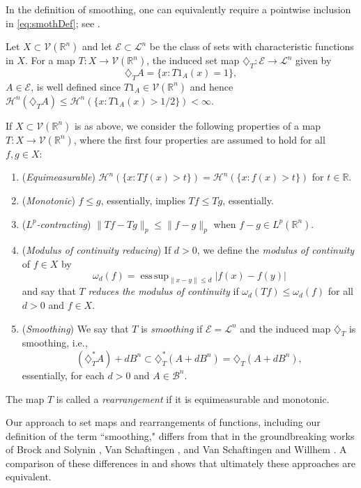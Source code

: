 \documentclass[12pt,reqno]{amsart}
\DeclareMathOperator*{\esssup}{ess\,sup}
\newcommand{\R}{{\mathbb R}}
\newcommand{\cH}{{\mathcal H}}
\newcommand{\cL}{\mathcal L}
\newcommand{\cE}{{\mathcal E}}
\newcommand{\cV}{{\mathcal V}}
\newcommand{\di}{\diamondsuit}
\numberwithin{equation}{section}
\begin{document}
In the definition of smoothing, one can equivalently require a pointwise inclusion in \eqref{eq:smothDef}; see \cite[p.~12]{BGGK2}.

Let $X\subset {\cV}(\R^n)$ and let $\cE\subset \cL^n$ be the class of sets with characteristic functions in $X$. For a map $T:X\to  {\cV}(\R^n)$, the induced set map $\di_T:\cE\to \cL^n$ given by
\begin{equation}\label{eqIndic}
\di_T A=\{x: T1_A(x)=1\},
\end{equation}
$A\in \cE$, is well defined since $T1_A\in {\cV}(\R^n)$ and hence  $\cH^n(\di_T A)\le \cH^n(\{x: T1_A(x)>1/2\})<\infty$.

If $X\subset {\cV}(\R^n)$ is as above, we consider the following properties of a map $T:X\to {\cV}(\R^n)$, where the first four properties are assumed to hold for all $f,g\in X$:

\begin{enumerate}
		\item[1.] ({\em Equimeasurable})\quad
		$
		{\mathcal{H}}^{n}(\{x: Tf(x)>t\})={\mathcal{H}}^{n}(\{x: f(x)>t\})
		$
		for $t\in \R$.
		\item[2.] ({\em Monotonic}) \quad $f\le g$, essentially, implies $Tf\le Tg$, essentially.
		\item[3.]  ({\em $L^p$-contracting}) \quad $\|Tf-Tg\|_p\le \|f-g\|_p$ when $f-g\in L^p(\R^n)$.
		\item[4.]   ({\em Modulus of continuity reducing})  If $d>0$, we define the {\em modulus of continuity} of $f\in X$ by
$$
\omega_{d}(f)=\esssup_{\|x-y\|\le d}|f(x)-f(y)|
$$
and say that $T$ {\em reduces the modulus of continuity} if $\omega_{d}(Tf)\le \omega_{d}(f)$ for all $d>0$ and $f\in X$.
		\item[5.] ({\em Smoothing}) \quad We say that $T$ is {\em smoothing} if $\cE=\mathcal L^n$ and the induced map $\di_T$ is smoothing, i.e.,
$$
(\di_T^*A)+d B^n\subset \di_T^*(A+d B^n)=\di_T(A+d B^n),
$$
essentially, for each $d>0$ and $A\in \mathcal B^n$.
\end{enumerate}

The map $T$ is called a {\em rearrangement} if it is equimeasurable and monotonic.

Our approach to set maps and rearrangements of functions, including our definition of the term ``smoothing," differs from that in the groundbreaking works of Brock and Solynin \cite{BS}, Van Schaftingen \cite{VSPhD}, and Van Schaftingen and Willhem \cite{VSW}.  A comparison of these differences in \cite[Appendix]{BGGK1} and \cite[Section~3]{BGGK2} shows that ultimately these approaches are equivalent.
\end{document}
